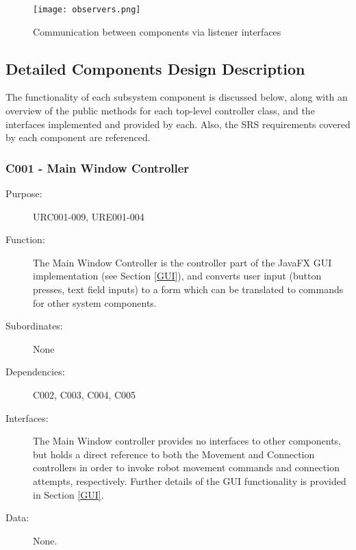 \documentclass[12pt]{article}
\begin{document}
\begin{figure}[!htb]
\texttt{[image: observers.png]}
\caption{Communication between components via listener interfaces}
  \label{fig:observers}
\end{figure}

\subsection{Detailed Components Design Description}\label{detailed}

The functionality of each subsystem component is discussed below, along with an overview of the public methods for each top-level controller class, and the interfaces implemented and provided by each. Also, the SRS requirements covered by each component are referenced.

\FloatBarrier
\subsubsection{C001 - Main Window Controller}
\begin{description}
\item [{Purpose:}] URC001-009, URE001-004
\item [{Function: }] The Main Window Controller is the controller part of the JavaFX GUI implementation (see Section \ref{GUI}), and converts user input (button presses, text field inputs) to a form which can be translated to commands for other system components. 
\item[{Subordinates: }] None
\item[{Dependencies: }] C002, C003, C004, C005
\item[{Interfaces: }] The Main Window controller provides no interfaces to other components, but holds a direct reference to both the Movement and Connection controllers in order to invoke robot movement commands and connection attempts, respectively. Further details of the GUI functionality is provided in Section \ref{GUI}.
\item[{Data: }] None.
\end{description}

\FloatBarrier
\end{document}
